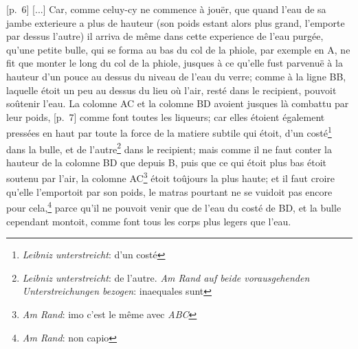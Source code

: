                 \vspace*{8mm}
                \pstart 
                \normalsize
           [p.~6] [...] Car, comme celuy-cy ne commence \`{a} jouër, que quand l'eau de sa jambe exterieure a plus de hauteur (son poids estant alors plus grand, l'emporte par dessus l'autre) il arriva de même dans cette experience de l'eau purg\'{e}e\protect{}, qu'une petite bulle, qui se forma au bas du col de la phiole, par exemple en A, ne fit que monter le long du col de la phiole, jusques \`{a} ce qu'elle fust parvenuë \`{a} la hauteur d'un pouce au dessus du niveau de l'eau du verre; comme \`{a} la ligne BB, laquelle \'{e}toit un peu au dessus du lieu o\`{u} l'air, rest\'{e} dans le recipient, pouvoit soûtenir l'eau. La colomne AC et la colomne BD avoient jusques l\`{a} combattu par leur poids, [p.~7] comme font toutes les liqueurs; car elles \'{e}toient \'{e}galement press\'{e}es en haut par toute la force de la matiere subtile\protect{} qui \'{e}toit, d'un cost\'{e}\footnote{\textit{Leibniz unterstreicht}: d'un cost\'{e}} dans la bulle, et de l'autre\footnote{\textit{Leibniz unterstreicht}: de l'autre.\newline%
           \textit{Am Rand auf beide vorausgehenden Unterstreichungen bezogen}: inaequales sunt} dans le recipient; mais comme il ne faut conter la hauteur de la colomne BD que depuis B, puis que ce qui \'{e}toit plus bas \'{e}toit soutenu par l'air, la colomne AC\footnote{\textit{Am Rand}: imo c'est le même avec \textit{ABC}} \'{e}toit toûjours la plus haute; et il faut croire qu'elle l'emportoit par son poids, le matras pourtant ne se vuidoit pas encore pour cela,\footnote{\textit{Am Rand}: non capio} parce qu'il ne pouvoit venir que de l'eau du cost\'{e} de BD, et la bulle cependant montoit, comme font tous les corps plus legers que l'eau.\pend
         \clearpage
         \pstart{}
